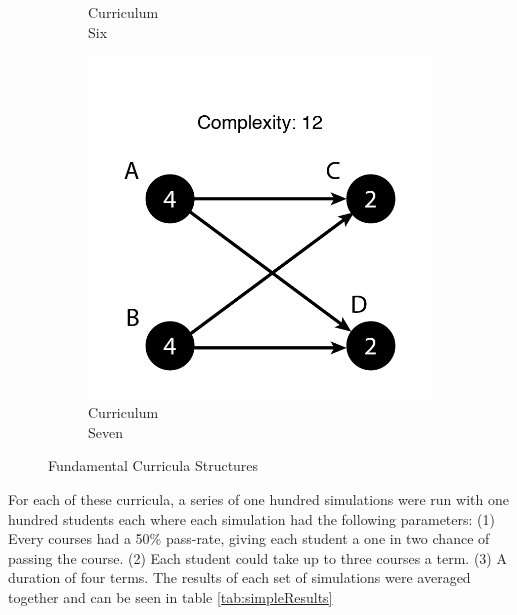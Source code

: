 \documentclass[botnum, fleqn]{unmeethesis}
\begin{document}
\begin{figure}
\begin{subfigure}[h!]{.20\linewidth}
        \caption{Curriculum \\ Six}\label{fig:simple11}
      \end{subfigure}
      \begin{subfigure}[h!]{.20\linewidth}
        \includegraphics[width=\linewidth]{./figures/Simple12.png}
        \caption{Curriculum \\ Seven}\label{fig:simple12}
      \end{subfigure}

      \caption{Fundamental Curricula Structures}
      \label{fig:simple}
    \end{figure}

    For each of these curricula, a series of one hundred simulations were run with one hundred students each where each simulation had the following parameters: 
    (1) Every courses had a 50\% pass-rate, giving each student a one in two chance of passing the course. (2) Each student could take up to three courses a term. (3) A duration of four terms.
    The results of each set of simulations were averaged together and can be seen in table \ref{tab:simpleResults}
\end{document}
